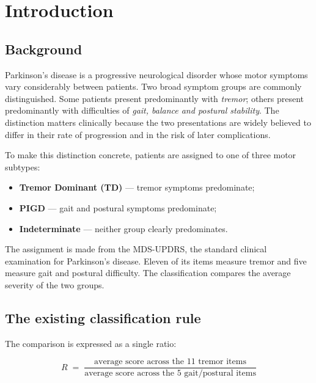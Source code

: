 \documentclass[11pt,a4paper]{article}
\begin{document}
\clearpage
\setcounter{tocdepth}{1}
\tableofcontents
\clearpage

\section{Introduction}

\subsection{Background}

Parkinson's disease is a progressive neurological disorder whose motor symptoms
vary considerably between patients. Two broad symptom groups are commonly
distinguished. Some patients present predominantly with \emph{tremor}; others
present predominantly with difficulties of \emph{gait, balance and postural
stability}. The distinction matters clinically because the two presentations are
widely believed to differ in their rate of progression and in the risk of later
complications.

To make this distinction concrete, patients are assigned to one of three motor
subtypes:

\begin{itemize}
  \item \textbf{Tremor Dominant (TD)} --- tremor symptoms predominate;
  \item \textbf{PIGD} --- gait and postural symptoms predominate;
  \item \textbf{Indeterminate} --- neither group clearly predominates.
\end{itemize}

The assignment is made from the MDS-UPDRS, the standard clinical examination for
Parkinson's disease. Eleven of its items measure tremor and five measure gait
and postural difficulty. The classification compares the average severity of the
two groups.

\subsection{The existing classification rule}

The comparison is expressed as a single ratio:

\[
  R \;=\; \frac{\text{average score across the 11 tremor items}}
               {\text{average score across the 5 gait/postural items}}
\]
\end{document}
